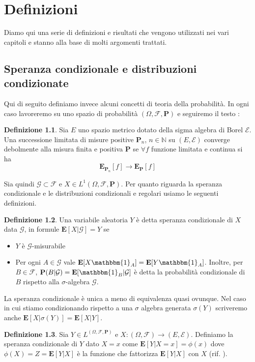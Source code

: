 \documentclass[a4paper,11pt]{book}
\theoremstyle{plain}
\theoremstyle{definition}
\newtheorem{defn}{Definizione}[chapter]
\theoremstyle{remark}
\newcommand{\N}{\mathbb{N}}
\newcommand{\F}{\mathcal{F}}
\newcommand{\Pro}{\mathbf{P}}
\newcommand{\E}{\mathbf{E}}
\begin{document}
\appendix
\chapter{Definizioni}
Diamo qui una serie di definizioni e risultati che vengono utilizzati nei vari capitoli e stanno alla base di molti argomenti trattati.
\section{Speranza condizionale e distribuzioni condizionate}
Qui di seguito definiamo invece alcuni concetti di teoria della probabilità. In ogni caso lavoreremo su uno spazio di probabilità $(\Omega, \F, \Pro)$ e seguiremo il testo \cite{Klenke}:
\begin{defn}
	Sia $E$ uno spazio metrico dotato della sigma algebra di Borel $\mathcal{E}$. Una successione limitata di misure positive $\Pro_n$, $n\in \N$ su $(E,\mathcal{E})$ converge debolmente alla misura finita e positiva $\Pro$ se $\forall f$ funzione limitata e continua si ha
	\begin{equation*}
	\E_{\Pro_n}[f]\rightarrow \E_{\Pro}[f]
	\end{equation*}
\end{defn}
Sia quindi $\mathcal{G}\subset\F$ e $X\in L^1(\Omega, \F, \Pro)$.\newline
Per quanto riguarda la speranza condizionale e le distribuzioni condizionali e regolari usiamo le seguenti definizioni.
\begin{defn}
	Una variabile aleatoria $Y$ è detta speranza condizionale di $X$ data $\mathcal{G}$, in formule $\E[X|\mathcal{G}]=Y$ se
	\begin{itemize}
	\item $Y$ è $\mathcal{G}$-misurabile
	\item Per ogni $A\in \mathcal{G}$ vale $\E[X\mathbbm{1}_A] = \E[Y\mathbbm{1}_A]$.
	Inoltre, per $B\in \F$, $\Pro(B|\mathcal{G}) = \E[\mathbbm{1}_B|\mathcal{G}]$ è detta la probabilità condizionale di $B$ rispetto alla $\sigma$-algebra $\mathcal{G}$.
	\end{itemize}
La speranza condizionale è unica a meno di equivalenza quasi ovunque.\newline
Nel caso in cui stiamo condizionando rispetto a una $\sigma$ algebra generata $\sigma(Y)$ scriveremo anche $\E[X|\sigma(Y)]=\E[X|Y]$.	
\end{defn}
\begin{defn}
	Sia $Y\in L^(\Omega, \F, \Pro)$ e $X:(\Omega,\F)\rightarrow (E,\mathcal{E})$. Definiamo la speranza condizionale di $Y$ dato $X=x$  come $\E[Y|X=x]=\phi(x)$ dove $\phi(X)=Z=\E[Y|X]$ è la funzione che fattorizza $\E[Y|X]$ con $X$ (rif. \cite{Klenke}).
\end{defn}
\end{document}
